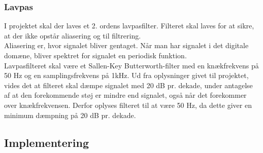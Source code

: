 \subsubsection{Lavpas}
I projektet skal der laves et 2. ordens lavpasfilter. Filteret skal laves for at sikre, at der ikke opstår aliasering og til filtrering.\\
Aliasering \cite{DSB} er, hvor signalet bliver gentaget. Når man har signalet i det digitale domæne, bliver spektret for signalet en periodisk funktion.\\
Lavpasfilteret skal være et Sallen-Key Butterworth-filter med en knækfrekvens på 50 Hz og en samplingsfrekvens på 1kHz. Ud fra oplysninger givet til projektet, vides det at filteret skal dæmpe signalet med 20 dB pr. dekade, under antagelse af at den forekommende støj er mindre end signalet, også når det forekommer over knækfrekvensen. Derfor oplyses filteret til at være 50 Hz, da dette giver en minimum dæmpning på 20 dB pr. dekade.

\subsection{Implementering}
